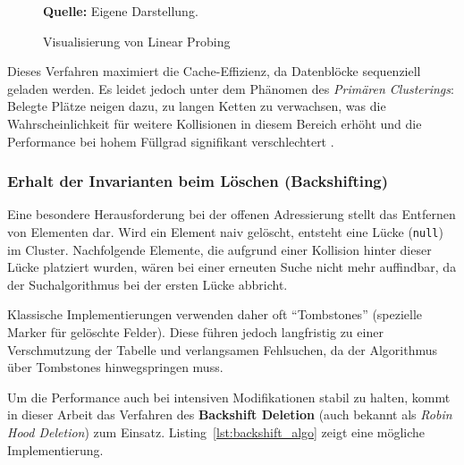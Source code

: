 \begin{figure}[h]
	\caption{Visualisierung von Linear Probing}
	\label{fig:linear_probing}
	
	\vspace{0.2cm}
	\raggedright \footnotesize \textbf{Quelle:} Eigene Darstellung.
\end{figure}

Dieses Verfahren maximiert die Cache-Effizienz, da Datenblöcke sequenziell geladen werden. Es leidet jedoch unter dem Phänomen des \emph{Primären Clusterings}: Belegte Plätze neigen dazu, zu langen Ketten zu verwachsen, was die Wahrscheinlichkeit für weitere Kollisionen in diesem Bereich erhöht und die Performance bei hohem Füllgrad signifikant verschlechtert \autocite[S. 293]{cormen2022introduction}.

\subsubsection{Erhalt der Invarianten beim Löschen (Backshifting)}
Eine besondere Herausforderung bei der offenen Adressierung stellt das Entfernen von Elementen dar. Wird ein Element naiv gelöscht, entsteht eine Lücke (\texttt{null}) im Cluster. Nachfolgende Elemente, die aufgrund einer Kollision hinter dieser Lücke platziert wurden, wären bei einer erneuten Suche nicht mehr auffindbar, da der Suchalgorithmus bei der ersten Lücke abbricht.

Klassische Implementierungen verwenden daher oft \enquote{Tombstones} (spezielle Marker für gelöschte Felder). Diese führen jedoch langfristig zu einer Verschmutzung der Tabelle und verlangsamen Fehlsuchen, da der Algorithmus über Tombstones hinwegspringen muss.

Um die Performance auch bei intensiven Modifikationen stabil zu halten, kommt in dieser Arbeit das Verfahren des \textbf{Backshift Deletion} (auch bekannt als \emph{Robin Hood Deletion}) zum Einsatz. Listing~\ref{lst:backshift_algo} zeigt eine mögliche Implementierung.

